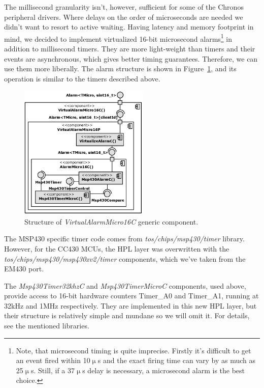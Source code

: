 The millisecond granularity isn't, however, sufficient for some of the Chronos peripheral drivers. Where delays on the order of microseconds are needed we didn't want to resort to active waiting. Having latency and memory footprint in mind, we decided to implement virtualized 16-bit microsecond alarms\footnote{Note, that microsecond timing is quite imprecise. Firstly it's difficult to get an event fired within 10$\upmu$s and the exact firing time can vary by as much as 25$\upmu$s. Still, if a 37$\upmu$s delay is necessary, a microsecond alarm is the best choice.} in addition to millisecond timers. They are more light-weight than timers and their events are asynchronous, which gives better timing guarantees. Therefore, we can use them more liberally. The alarm structure is shown in Figure~\ref{fig:virutal_alarm_micro_16_c}, and its operation is similar to the timers described above.
\begin{figure}[h]
  \centering
  \includegraphics[width=0.55\textwidth]{diagrams/virutal_alarm_micro_16_c.eps}
  \caption{Structure of \emph{VirtualAlarmMicro16C} generic component.}
  \label{fig:virutal_alarm_micro_16_c}
\end{figure}

The MSP430 specific timer code comes from \emph{tos/chips/\-msp430/timer} library. However, for the CC430 MCUs, the HPL layer was overwritten with the \emph{tos/chips/msp430/\-msp430xv2/timer} components, which we've taken from the EM430 port.

The \emph{Msp430Timer32khzC} and  \emph{Msp430TimerMicroC} components, used above, provide access to 16-bit hardware counters Timer\_A0 and Timer\_A1, running at 32kHz and 1MHz respectively. They are implemented in this new HPL layer, but their structure is relatively simple and mundane so we will omit it. For details, see the mentioned libraries.


